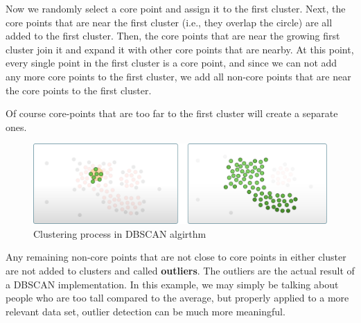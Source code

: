     Now we randomly select a core point and assign it to the first cluster. Next, the core points that are near the first cluster (i.e., they overlap the circle) are all added to the first cluster. Then, the core points that are near the growing first cluster join it and expand it with other core points that are nearby.
    At this point, every single point in the first cluster is a core point, and since we can not add any more core points to the first cluster, we add all non-core points that are near the core points to the first cluster.
    
    Of course core-points that are too far to the first cluster will create a separate ones.
    
    \begin{figure}[H]
        \centering
        \includegraphics[width=16cm]{Images/1/dbscan-ex-4.png}
        \caption{Clustering process in DBSCAN algirthm}
    \end{figure}
    
    Any remaining non-core points that are not close to core points in either cluster are not added to clusters and called \textbf{outliers}.
    The outliers are the actual result of a DBSCAN implementation. In this example, we may simply be talking about people who are too tall compared to the average, but properly applied to a more relevant data set, outlier detection can be much more meaningful.
